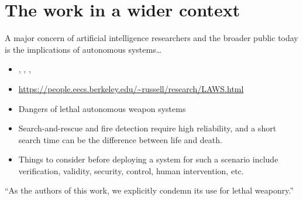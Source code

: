 \section{The work in a wider context}
\label{sec:discussion-wider}

A major concern of artificial intelligence researchers and the broader public today is the implications of autonomous systems\dots

\begin{itemize}
    \item \cite{russell_research_2015}, \cite{vinuesa_role_2020}, \cite{russell_provably_2022}, \cite{brundage_malicious_2018}
    \item \url{https://people.eecs.berkeley.edu/~russell/research/LAWS.html}
    \item Dangers of lethal autonomous weapon systems
    \item Search-and-rescue and fire detection require high reliability, and a short search time can be the difference between life and death.
    \item Things to consider before deploying a system for such a scenario include verification, validity, security, control, human intervention, etc.
\end{itemize}

``As the authors of this work, we explicitly condemn its use for lethal weaponry.''
